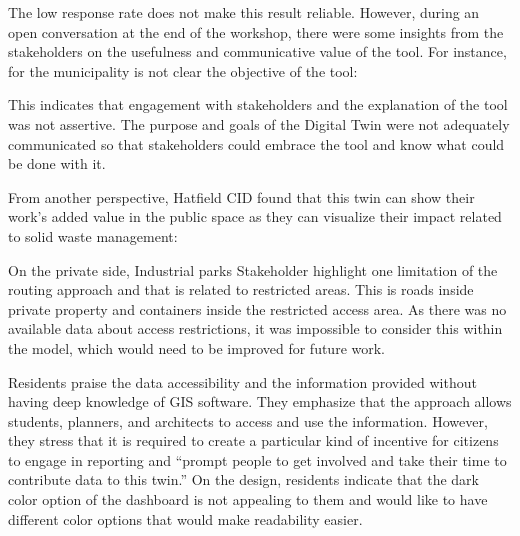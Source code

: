 \documentclass[authoryear,preprint,review,12pt]{elsarticle}
\begin{document}
    The low response rate does not make this result reliable. However, during an open conversation at the end of the workshop, there were some insights from the stakeholders on the usefulness and communicative value of the tool. For instance, for the municipality is not clear the objective of the tool:

    \begin{quotation}
    \end{quotation}

    This indicates that engagement with stakeholders and the explanation of the tool was not assertive. The purpose and goals of the Digital Twin were not adequately communicated so that stakeholders could embrace the tool and know what could be done with it.

    From another perspective, Hatfield CID found that this twin can show their work's added value in the public space as they can visualize their impact related to solid waste management:

    \begin{quotation}
    \end{quotation}

    On the private side, Industrial parks Stakeholder highlight one limitation of the routing approach and that is related to restricted areas. This is roads inside private property and containers inside the restricted access area. As there was no available data about access restrictions, it was impossible to consider this within the model, which would need to be improved for future work.

    Residents praise the data accessibility and the information provided without having deep knowledge of GIS software. They emphasize that the approach allows students, planners, and architects to access and use the information. However, they stress that it is required to create a particular kind of incentive for citizens to engage in reporting and “prompt people to get involved and take their time to contribute data to this twin.” On the design, residents indicate that the dark color option of the dashboard is not appealing to them and would like to have different color options that would make readability easier.
\end{document}

